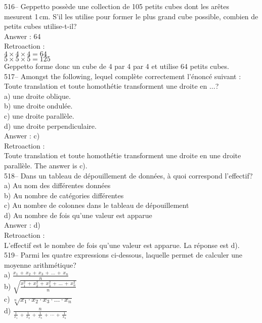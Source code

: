 ﻿\documentclass[letterpaper, 12pt]{article}
\begin{document}
516-- Geppetto poss\`ede une collection de 105 petits cubes dont les
ar\^etes mesurent 1\,cm.  S'il les utilise pour former le plus grand cube
possible, combien de petits cubes utilise-t-il?  \\

Answer : 64\\

Retroaction :  \\
$4\times4\times4=64$\\
$5\times5\times5=125$\\
Geppetto forme donc un cube de 4 par 4 par 4 et utilise 64 petits cubes.  \\

517-- Amongst the following, lequel compl\`ete
correctement l'\'enonc\'e suivant : \og Toute translation et toute
homoth\'etie transforment une droite en $\ldots$\fg ?\\
a) une droite oblique.\\
b) une droite ondul\'ee.\\
c) une droite parall\`ele.\\
d) une droite perpendiculaire.\\

Answer : c)\\

Retroaction : \\
Toute translation et toute homoth\'etie transforment une droite en une
droite parall\`ele.  The answer is c).\\


518-- Dans un tableau de d\'epouillement de donn\'ees, \`a quoi correspond
l'effectif?\\
a) Au nom des diff\'erentes donn\'ees\\
b) Au nombre de cat\'egories diff\'erentes\\
c) Au nombre de colonnes dans le tableau de d\'epouillement\\
d) Au nombre de fois qu'une valeur est apparue\\

Answer : d)\\

Retroaction : \\
L'effectif est le nombre de fois qu'une valeur est apparue.  La r\'eponse
est d).\\

519-- Parmi les quatre expressions ci-dessous, laquelle permet de calculer
une moyenne arithm\'etique?\\
a) $\frac{x_1\,+\,x_2\,+\,x_3\,+\,\ldots\,+\,x_n}{n}$\\[2mm]
b)
$\sqrt{\frac{x_1^{2}\,+\,x_2^{2}\,+\,x_3^{2}\,+\,\ldots\,+\,x_n^{2}}{n}}$\\[2mm]
c) $\sqrt[n]{x_1 \cdot x_2 \cdot x_3 \cdot \ldots \cdot x_n}$\\[2mm]
d)
$\frac{n}{\frac{1}{x_1}\,+\,\frac{1}{x_2}\,+\,\frac{1}{x_3}\,+\,\cdots\,+\,\frac{1}{x_n}}$\\
\end{document}
